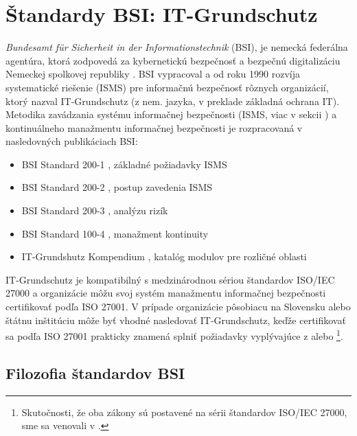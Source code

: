\chapter{Štandardy BSI: IT-Grundschutz}
\label{chap:it-grundschutz}
\emph{Bundesamt für Sicherheit in der Informationstechnik} (BSI), je nemecká federálna agentúra,
ktorá zodpovedá za kybernetickú bezpečnosť a bezpečnú digitalizáciu Nemeckej spolkovej republiky \cite{bsibundde}.
BSI vypracoval a od roku 1990 rozvíja systematické riešenie (ISMS) pre informačnú bezpečnosť rôznych organizácií,
ktorý nazval IT-Grundschutz (z nem. jazyka, v preklade základná ochrana IT). Metodika zavádzania systému informačnej
bezpečnosti (ISMS, viac v sekcii ) a kontinuálneho manažmentu informačnej bezpečnosti je rozpracovaná
v nasledovných publikáciach BSI:

\begin{itemize}[nosep]
    \item BSI Standard 200-1 \cite{BSI1}, základné požiadavky ISMS
    \item BSI Standard 200-2 \cite{BSI2}, postup zavedenia ISMS
    \item BSI Standard 200-3 \cite{BSI3}, analýzu rizík
    \item BSI Standard 100-4 \cite{BSI4}, manažment kontinuity
    \item IT-Grundshutz Kompendium \cite{GSK}, katalóg modulov pre rozličné oblasti
\end{itemize}

IT-Grundschutz je kompatibilný s medzinárodnou sériou štandardov ISO/IEC 27000 a organizácie môžu svoj systém manažmentu
informačnej bezpečnosti certifikovať podľa ISO 27001. V prípade organizácie pôsobiacu na Slovensku alebo štátnu
inštitúciu môže byť vhodné nasledovať IT-Grundschutz, keďže certifikovať sa podľa ISO 27001 prakticky znamená splniť
požiadavky vyplývajúce z \cite{ZoKB} alebo \cite{ZoITVS}\footnote{Skutočnosti, že oba zákony sú postavené na sérii
štandardov ISO/IEC 27000, sme sa venovali v \cite{BP}.}.


\section{Filozofia štandardov BSI}
\label{sec:bsiphilosophy}

